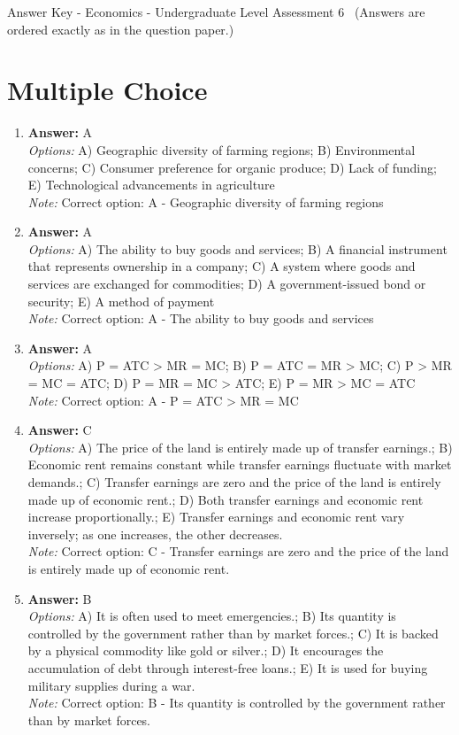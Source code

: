 \documentclass[12pt]{article}
\begin{document}
\begin{center}
Answer Key - Economics - Undergraduate Level Assessment 6 \
\small (Answers are ordered exactly as in the question paper.)
\end{center}

\section*{Multiple Choice}
\begin{enumerate}[label=\arabic*.]
\item \textbf{Answer:} A
\\ \textit{Options:} A) Geographic diversity of farming regions; B) Environmental concerns; C) Consumer preference for organic produce; D) Lack of funding; E) Technological advancements in agriculture
\\ \textit{Note:} Correct option: A - Geographic diversity of farming regions
\item \textbf{Answer:} A
\\ \textit{Options:} A) The ability to buy goods and services; B) A financial instrument that represents ownership in a company; C) A system where goods and services are exchanged for commodities; D) A government-issued bond or security; E) A method of payment
\\ \textit{Note:} Correct option: A - The ability to buy goods and services
\item \textbf{Answer:} A
\\ \textit{Options:} A) P = ATC \textgreater{} MR = MC; B) P = ATC = MR \textgreater{} MC; C) P \textgreater{} MR = MC = ATC; D) P = MR = MC \textgreater{} ATC; E) P = MR \textgreater{} MC = ATC
\\ \textit{Note:} Correct option: A - P = ATC \textgreater{} MR = MC
\item \textbf{Answer:} C
\\ \textit{Options:} A) The price of the land is entirely made up of transfer earnings.; B) Economic rent remains constant while transfer earnings fluctuate with market demands.; C) Transfer earnings are zero and the price of the land is entirely made up of economic rent.; D) Both transfer earnings and economic rent increase proportionally.; E) Transfer earnings and economic rent vary inversely; as one increases, the other decreases.
\\ \textit{Note:} Correct option: C - Transfer earnings are zero and the price of the land is entirely made up of economic rent.
\item \textbf{Answer:} B
\\ \textit{Options:} A) It is often used to meet emergencies.; B) Its quantity is controlled by the government rather than by market forces.; C) It is backed by a physical commodity like gold or silver.; D) It encourages the accumulation of debt through interest-free loans.; E) It is used for buying military supplies during a war.
\\ \textit{Note:} Correct option: B - Its quantity is controlled by the government rather than by market forces.
\end{enumerate}
\end{document}
